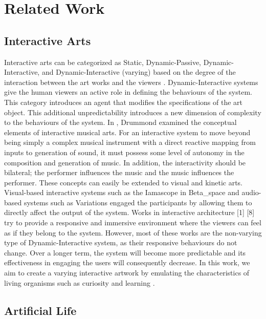 \chapter{Related Work} \label{chap:related_work}

\section{Interactive Arts}
Interactive arts can be categorized as Static, Dynamic-Passive, Dynamic-Interactive, and Dynamic-Interactive (varying) based on the degree of the interaction between the art works and the viewers \cite{Edmonds2004}. Dynamic-Interactive systems give the human viewers an active role in defining the behaviours of the system. This category introduces an agent that modifies the specifications of the art object. This additional unpredictability introduces a new dimension of complexity to the behaviours of the system. 
In \cite{Drummond2009}, Drummond examined the conceptual elements of interactive musical arts. For an interactive system to move beyond being simply a complex musical instrument with a direct reactive mapping from inputs to generation of sound, it must possess some level of autonomy in the composition and generation of music. In addition, the interactivity should be bilateral; the performer influences the music and the music influences the performer. These concepts can easily be extended to visual and kinetic arts. Visual-based interactive systems such as the Iamascope in Beta\_space \cite{Costello2005} and audio-based systems such as Variations \cite{Wands} engaged the participants by allowing them to directly affect the output of the system. Works in interactive architecture [1] [8] try to provide a responsive and immersive environment where the viewers can feel as if they belong to the system. 
However, most of these works are the non-varying type of Dynamic-Interactive system, as their responsive behaviours do not change. Over a longer term, the system will become more predictable and its effectiveness in engaging the users will consequently decrease. In this work, we aim to create a varying interactive artwork by emulating the characteristics of living organisms such as curiosity and learning \cite{Beesley2012}. 

\section{Artificial Life}


